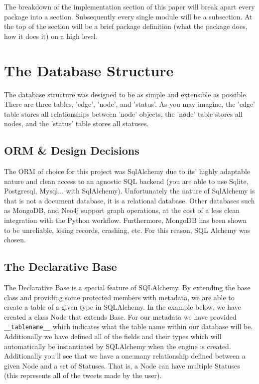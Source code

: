The breakdown of the implementation section of this paper will break apart every package into a section. Subsequently every single module will be a subsection. At the top of the section will be a brief package definition (what the package does, how it does it) on a high level.
\section{The Database Structure}
The database structure was designed to be as simple and extensible as possible. There are three tables, 'edge', 'node', and 'status'. As you may imagine, the 'edge' table stores all relationships between 'node' objects, the 'node' table stores all nodes, and the 'status' table stores all statuses.
\subsection{ORM \& Design Decisions}
The ORM of choice for this project was SqlAlchemy due to its' highly adaptable nature and clean access to an agnostic SQL backend (you are able to use Sqlite, Postgresql, Mysql... with SqlAlchemy). Unfortunately the nature of SqlAlchemy is that is not a document database, it is a relational database. Other databases such as MongoDB, and Neo4j support graph operations, at the cost of a less clean integration with the Python workflow. Furthermore, MongoDB has been shown to be unreliable, losing records, crashing, etc. For this reason, SQL Alchemy was chosen.
\subsection{The Declarative Base}
The Declarative Base is a special feature of SQLAlchemy. By extending the base class and providing some protected members with metadata, we are able to create a table of a given type in SQLAlchemy. In the example below, we have created a class Node that extends Base. For our metadata we have provided \verb|__tablename__| which indicates what the table name within our database will be. Additionally we have defined all of the fields and their types which will automatically be instantiated by SQLAlchemy when the engine is created. Additionally you'll see that we have a one:many relationship defined between a given Node and a set of Statuses. That is, a Node can have multiple Statuses (this represents all of the tweets made by the user).
\\
\\

